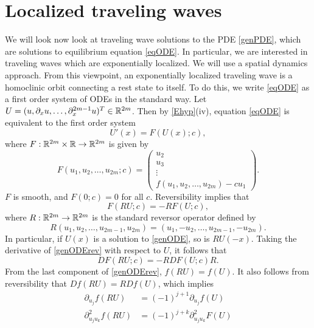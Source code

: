 \documentclass[thesis.tex]{subfiles}
\begin{document}
\section{Localized traveling waves}\label{sec:travelingwaves}

We will look now look at traveling wave solutions to the PDE \cref{genPDE}, which are solutions to equilibrium equation \cref{eqODE}. In particular, we are interested in traveling waves which are exponentially localized. We will use a spatial dynamics approach. From this viewpoint, an exponentially localized traveling wave is a homoclinic orbit connecting a rest state to itself. To do this, we write \cref{eqODE} as a first order system of ODEs in the standard way. Let $U = (u, \partial_x u, \dots, \partial_x^{2m-1} u)^T \in \mathbb{R}^{2m}$. Then by \cref{Ehyp}(iv), equation \cref{eqODE} is equivalent to the first order system
\begin{equation}\label{genODE}
U'(x) = F(U(x); c),
\end{equation}
where $F: \mathbb{R}^{2m} \times \mathbb{R} \rightarrow \mathbb{R}^{2m}$ is given by
\begin{equation}\label{defF}
F(u_1, u_2, \dots, u_{2m}; c) = 
\begin{pmatrix}
u_2 \\ u_3 \\ \vdots \\ f(u_1, u_2, \dots, u_{2m}) - c u_1
\end{pmatrix}.
\end{equation}
$F$ is smooth, and $F(0; c) = 0$ for all $c$. Reversibility implies that
\begin{equation}\label{genODErev}
F(RU; c) = -RF(U; c),
\end{equation}
where $R:\mathbb{R}^{2m} \rightarrow \mathbb{R}^{2m}$ is the standard reversor operator defined by
\begin{equation}\label{reverserR2m}
R(u_1, u_2, \dots, u_{2m-1}, u_{2m}) = (u_1, -u_2, \dots, u_{2m-1}, -u_{2m}).
\end{equation}
In particular, if $U(x)$ is a solution to \cref{genODE}, so is $RU(-x)$. Taking the derivative of \cref{genODErev} with respect to $U$, it follows that 
\begin{equation}\label{genODErevDF}
D F(RU; c) = -RDF(U; c)R.
\end{equation}
From the last component of \eqref{genODErev}, $f(RU) = f(U)$. It also follows from reversibility that $Df(RU) = RDf(U)$, which implies
\begin{equation}\label{frev}
\begin{aligned}
\partial_{u_j} f(R U) &= (-1)^{j+1} \partial_{u_j} f(U) \\
\partial^2_{u_j u_k} f(R U) &= (-1)^{j+k} \partial^2_{u_j u_k} F(U)
\end{aligned}
\end{equation}
\end{document}

